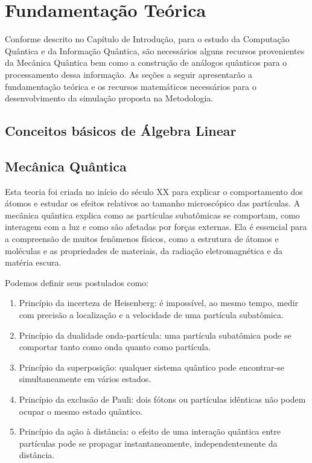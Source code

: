
\chapter{Fundamentação Teórica}

Conforme descrito no Capítulo de Introdução, para o estudo da Computação Quântica e da Informação Quântica, são necessários alguns recursos provenientes da Mecânica Quântica bem como a construção de análogos quânticos para o processamento dessa informação. As seções a seguir apresentarão a fundamentação teórica e os recursos matemáticos necessários para o desenvolvimento da simulação proposta na Metodologia.

\section{Conceitos básicos de Álgebra Linear}


\section{Mecânica Quântica}\label{Mecanicaquantica}

Esta teoria foi criada no início do século XX para explicar o comportamento dos átomos e estudar os efeitos relativos ao tamanho microscópico das partículas. A mecânica quântica explica como as partículas subatômicas se comportam, como interagem com a luz e como são afetadas por forças externas. Ela é essencial para a compreensão de muitos fenômenos físicos, como a estrutura de átomos e moléculas e as propriedades de materiais, da radiação eletromagnética e da matéria escura.

Podemos definir seus postulados como:
\begin{enumerate}
\item Princípio da incerteza de Heisenberg: é impossível, ao mesmo tempo, medir com precisão a localização e a velocidade de uma partícula subatômica.

\item Princípio da dualidade onda-partícula: uma partícula subatômica pode se comportar tanto como onda quanto como partícula.

\item Princípio da superposição: qualquer sistema quântico pode encontrar-se simultaneamente em vários estados.

\item Princípio da exclusão de Pauli: dois fótons ou partículas idênticas não podem ocupar o mesmo estado quântico.

\item Princípio da ação à distância: o efeito de uma interação quântica entre partículas pode se propagar instantaneamente, independentemente da distância.
\end{enumerate}

